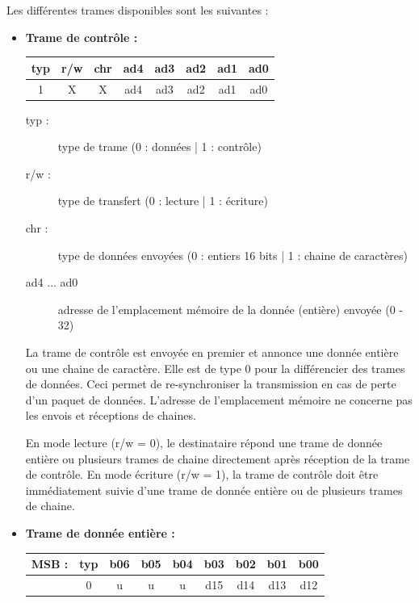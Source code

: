 \documentclass[11pt, french]{article} %
\begin{document}
\medskip
\noindent
Les différentes trames disponibles sont les suivantes :
\medskip
\begin{itemize}
	\item\textbf{ Trame de contrôle :} \\

		\begin{tabular} {|c|c|c|c|c|c|c|c|}
			\hline
			\textbf{typ} & \textbf{r/w} & \textbf{chr} & \textbf{ad4} & \textbf{ad3} & \textbf{ad2} & \textbf{ad1} & \textbf{ad0}\\
			\hline
			1 & X &  X &  ad4 &  ad3 &  ad2 &  ad1 &  ad0 \\ \hline
		\end{tabular}

		\begin{description}
			\item[typ :] type de trame (0 : données | 1 : contrôle)
			\item[r/w :] type de transfert (0 : lecture | 1 : écriture)
			\item[chr :] type de données envoyées (0 : entiers 16 bits | 1 : chaine de caractères)
			\item[ad4 ... ad0] adresse de l'emplacement mémoire de la donnée (entière) envoyée (0 - 32)
		\end{description}

		La trame de contrôle est envoyée en premier et annonce une donnée entière ou une chaine de caractère. Elle est de type 0 pour la différencier des trames de données. Ceci permet de re-synchroniser la transmission en cas de perte d'un paquet de données. L'adresse de l'emplacement mémoire ne concerne pas les envois et réceptions de chaines.

\medskip
		En mode lecture (r/w = 0), le destinataire répond une trame de donnée entière ou plusieurs trames de chaine directement après réception de la trame de contrôle. En mode écriture (r/w = 1), la trame de contrôle doit être immédiatement suivie d'une trame de donnée entière ou de plusieurs trames de chaine.


	\medskip
	\item\textbf{ Trame de donnée entière :} \\

		\begin{tabular} {|c|c|c|c|c|c|c|c|c|}
			\hline
			\textbf{MSB :} & \textbf{typ} & \textbf{b06} & \textbf{b05} & \textbf{b04} & \textbf{b03} & \textbf{b02} & \textbf{b01} & \textbf{b00}\\
			\hline
			 & 0 & u &  u &  u &  d15 &  d14 &  d13 &  d12 \\ \hline
		\end{tabular}


\end{itemize}
\end{document}
